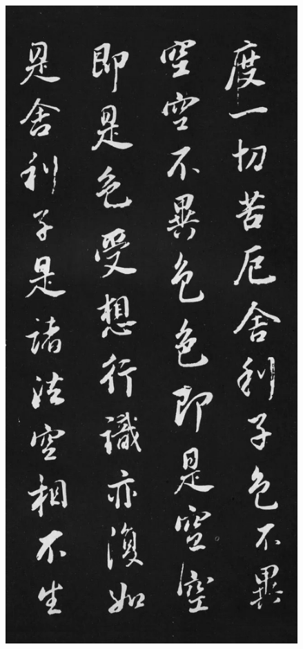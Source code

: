 \documentclass[a4paper,twoside]{article}
\begin{document}
\begin{figure}[ht]
\centering
\includegraphics[width=11.2cm]{images/dongqichang-2}
\end{figure}
\end{document}
